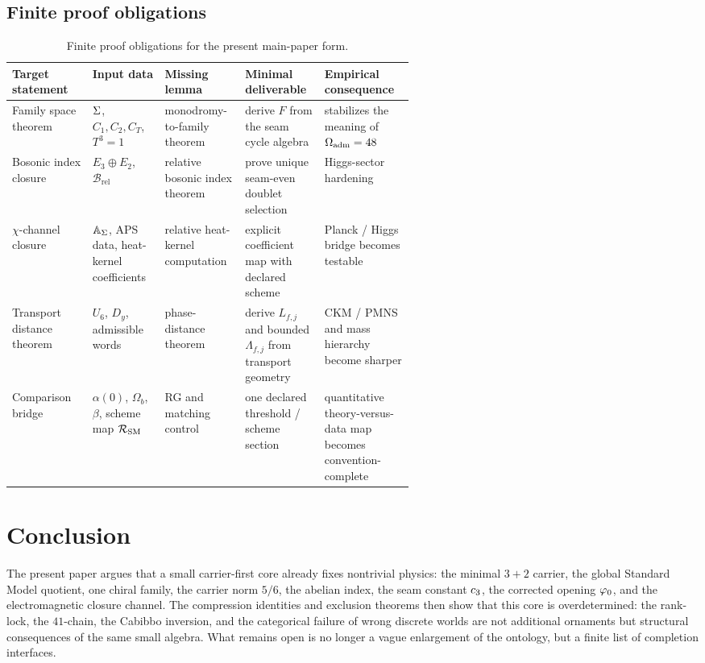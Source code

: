\subsection{Finite proof obligations}

\begin{table}[t]
\centering
\small
\begin{tabularx}{\linewidth}{@{}>{\raggedright\arraybackslash}p{0.20\linewidth}>{\raggedright\arraybackslash}p{0.18\linewidth}>{\raggedright\arraybackslash}p{0.20\linewidth}YY@{}}
\toprule
Target statement & Input data & Missing lemma & Minimal deliverable & Empirical consequence \\
\midrule
Family space theorem & $\Sigma$, $C_1,C_2,C_T$, $T^3=1$ & monodromy-to-family theorem & derive $F$ from the seam cycle algebra & stabilizes the meaning of $\Omega_{\mathrm{adm}}=48$ \\
Bosonic index closure & $E_3\oplus E_2$, $\mathcal B_{\mathrm{rel}}$ & relative bosonic index theorem & prove unique seam-even doublet selection & Higgs-sector hardening \\
$\chi$-channel closure & $\mathbb A_{\Sigma}$, APS data, heat-kernel coefficients & relative heat-kernel computation & explicit coefficient map with declared scheme & Planck / Higgs bridge becomes testable \\
Transport distance theorem & $U_6$, $D_y$, admissible words & phase-distance theorem & derive $L_{f,j}$ and bounded $\Lambda_{f,j}$ from transport geometry & CKM / PMNS and mass hierarchy become sharper \\
Comparison bridge & $\alpha(0)$, $\Omega_b$, $\beta$, scheme map $\mathcal R_{\mathrm{SM}}$ & RG and matching control & one declared threshold / scheme section & quantitative theory-versus-data map becomes convention-complete \\
\bottomrule
\end{tabularx}
\caption{Finite proof obligations for the present main-paper form.}
\label{tab:proof-obligations}
\end{table}

\section{Conclusion}

The present paper argues that a small carrier-first core already fixes nontrivial physics: the minimal $3+2$ carrier, the global Standard Model quotient, one chiral family, the carrier norm $5/6$, the abelian index, the seam constant $c_3$, the corrected opening $\varphi_0$, and the electromagnetic closure channel. The compression identities and exclusion theorems then show that this core is overdetermined: the rank-lock, the $41$-chain, the Cabibbo inversion, and the categorical failure of wrong discrete worlds are not additional ornaments but structural consequences of the same small algebra. What remains open is no longer a vague enlargement of the ontology, but a finite list of completion interfaces.

